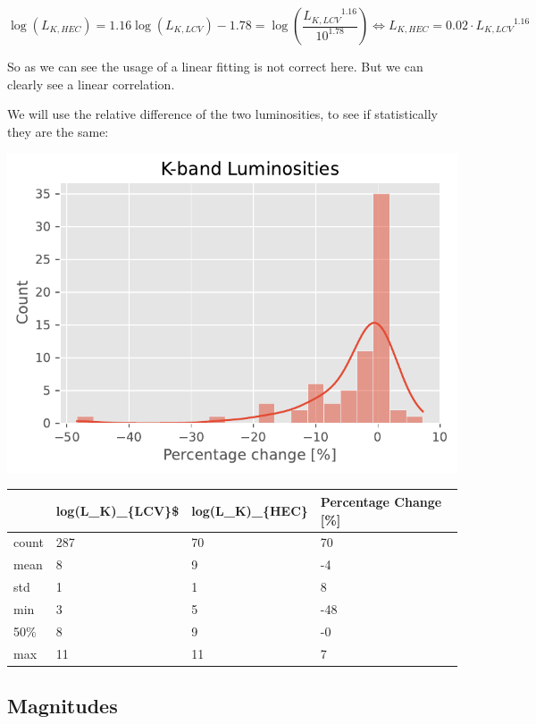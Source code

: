 \documentclass[
]{article}
\begin{document}
\[
\log(L_{K,HEC})=1.16\log(L_{K,LCV})-1.78=\log\left(\frac{{L_{K,LCV}}^{1.16}}{10^{1.78}}\right) \Leftrightarrow L_{K,HEC}=0.02\cdot{L_{K,LCV}}^{1.16}
\]

So as we can see the usage of a linear fitting is not correct here. But
we can clearly see a linear correlation.

We will use the relative difference of the two luminosities, to see if
statistically they are the same:

\includegraphics{compare_files/figure-pdf/cell-29-output-1.pdf}

\begin{longtable}[]{@{}llll@{}}
\toprule\noalign{}
& log(L\_K)\_\{LCV\}\$ & log(L\_K)\_\{HEC\} & Percentage Change
{[}\%{]} \\
\midrule\noalign{}
\endhead
\bottomrule\noalign{}
\endlastfoot
count & 287 & 70 & 70 \\
mean & 8 & 9 & -4 \\
std & 1 & 1 & 8 \\
min & 3 & 5 & -48 \\
50\% & 8 & 9 & -0 \\
max & 11 & 11 & 7 \\
\end{longtable}

\subsection{Magnitudes}\label{magnitudes}
\end{document}
